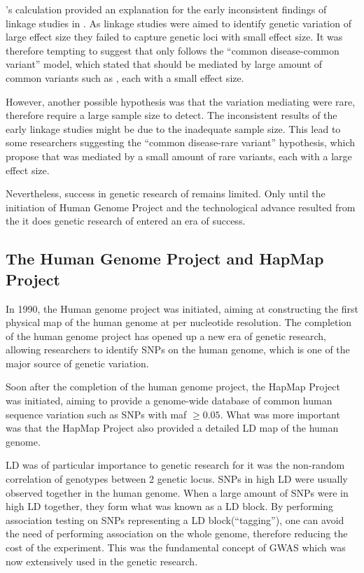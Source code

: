\documentclass[12pt]{book}
\newcommand*{\glng}{\glsentrylong}
\begin{document}
	\citeauthor{Risch1990a}'s calculation provided an explanation for the early inconsistent findings of linkage studies in \glng{scz}\citep{Harrison2005}.
	As linkage studies were aimed to identify genetic variation of large effect size they failed to capture genetic loci with small effect size.
	It was therefore tempting to suggest that \glng{scz} only follows the ``common disease-common variant'' model, which stated that \glng{scz} should be mediated by large amount of common variants such as \glng{SNP}, each with a small effect size.
	
	However, another possible hypothesis was that the variation mediating \glng{scz} were rare, therefore require a large sample size to detect. 
	The inconsistent results of the early linkage studies might be due to the inadequate sample size. 
	This lead to some researchers suggesting the ``common disease-rare variant'' hypothesis, which propose that \glng{scz} was mediated by a small amount of rare variants, each with a large effect size\citep{McClellan2007}.
	
	Nevertheless, success in genetic research of \glng{scz} remains limited.
	Only until the initiation of Human Genome Project and the technological advance resulted from the it does genetic research of \glng{scz} entered an era of success.

	\subsection{The Human Genome Project and HapMap Project}
	In 1990, the Human genome project was initiated, aiming at constructing the first physical map of the human genome at per nucleotide resolution\citep{Lander2001}.
	The completion of the human genome project has opened up a new era of genetic research, allowing researchers to identify \glspl{SNP} on the human genome, which is one of the major source of genetic variation.
	
	Soon after the completion of the human genome project, the HapMap Project was initiated\citep{Consortium2005}, aiming to provide a genome-wide database of common human sequence variation such as \glspl{SNP} with \gls{maf} $\ge0.05$.
	What was more important was that the HapMap Project also provided a detailed \gls{LD} map of the human genome.
	
	\gls{LD} was of particular importance to genetic research for it was the non-random correlation of genotypes between 2 genetic locus. 
	\glspl{SNP} in high \gls{LD} were usually observed together in the human genome.
	When a large amount of \glspl{SNP} were in high \gls{LD} together, they form what was known as a \gls{LD} block.
	By performing association testing on \glspl{SNP} representing a \gls{LD} block(``tagging''), one can avoid the need of performing association on the whole genome, therefore reducing the cost of the experiment.
	This was the fundamental concept of \gls{GWAS} which was now extensively used in the genetic research.
	
\end{document}
